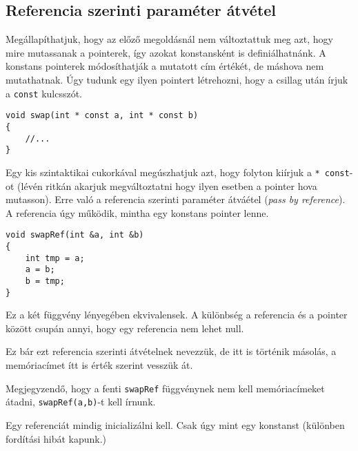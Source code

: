 \documentclass[a4paper,11.5pt]{article}
\begin{document}
	\subsection{Referencia szerinti paraméter átvétel}
	Megállapíthatjuk, hogy az előző megoldásnál nem változtattuk meg azt, hogy mire mutassanak a pointerek, így azokat konstansként is definiálhatnánk. A konstans pointerek módosíthatják a mutatott cím értékét, de máshova nem mutathatnak. Úgy tudunk egy ilyen pointert létrehozni, hogy a csillag után írjuk a \texttt{const} kulcsszót.
	\begin{lstlisting}
void swap(int * const a, int * const b)
{
	//...
}
	\end{lstlisting}
	Egy kis szintaktikai cukorkával megúszhatjuk azt, hogy folyton kiírjuk a \texttt{* const}-ot (lévén ritkán akarjuk megváltoztatni hogy ilyen esetben a pointer hova mutasson). Erre való a {referencia szerinti paraméter átváétel} (\textit{pass by reference}). A referencia úgy működik, mintha egy konstans pointer lenne.
	\begin{lstlisting}
void swapRef(int &a, int &b)
{
	int tmp = a;
	a = b;
	b = tmp;
}
	\end{lstlisting} 
	Ez a két függvény lényegében ekvivalensek. A különbség a referencia és a pointer között csupán annyi, hogy egy referencia nem lehet null.
	\begin{note}
		Ez bár ezt referencia szerinti átvételnek nevezzük, de itt is történik másolás, a memóriacímet ítt is érték szerint vesszük át.
	\end{note}
		Megjegyzendő, hogy a fenti \texttt{swapRef} függvénynek nem kell memóriacímeket átadni, \texttt{swapRef(a,b)}-t kell írnunk.
	\begin{note}
		Egy referenciát mindig inicializálni kell. Csak úgy mint egy konstanst (különben fordítási hibát kapunk.)
	\end{note}
\end{document}
